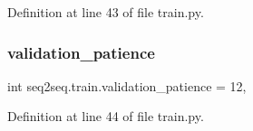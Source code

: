 Definition at line 43 of file train.\+py.

\mbox{\label{namespaceseq2seq_1_1train_a3ad0547cc33e5fbe164d33c47c452658}} 
\subsubsection{\texorpdfstring{validation\+\_\+patience}{validation\_patience}}
{\footnotesize\ttfamily int seq2seq.\+train.\+validation\+\_\+patience = 12,}



Definition at line 44 of file train.\+py.


